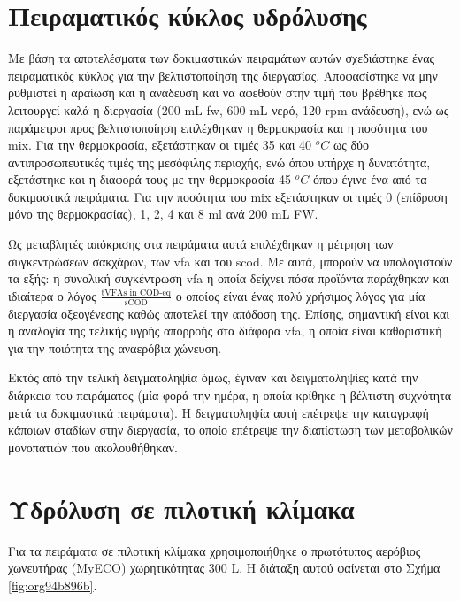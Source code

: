 \documentclass[11pt]{report}
\begin{document}
\section{Πειραματικός κύκλος υδρόλυσης}
\label{sec:orgeabfe86}
\label{sec:lab-hydro}
Με βάση τα αποτελέσματα των δοκιμαστικών πειραμάτων αυτών σχεδιάστηκε ένας πειραματικός κύκλος για την βελτιστοποίηση της διεργασίας. Αποφασίστηκε να μην ρυθμιστεί η αραίωση και η ανάδευση και να αφεθούν στην τιμή που βρέθηκε πως λειτουργεί καλά η διεργασία (200 mL \acrshort{fw}, 600 mL νερό, 120 rpm ανάδευση), ενώ ως παράμετροι προς βελτιστοποίηση επιλέχθηκαν η θερμοκρασία και η ποσότητα του \acrshort{mix}. Για την θερμοκρασία, εξετάστηκαν οι τιμές 35 και 40 \(^oC\) ως δύο αντιπροσωπευτικές τιμές της μεσόφιλης περιοχής, ενώ όπου υπήρχε η δυνατότητα, εξετάστηκε και η διαφορά τους με την θερμοκρασία 45 \(^oC\) όπου έγινε ένα από τα δοκιμαστικά πειράματα. Για την ποσότητα του \acrshort{mix} εξετάστηκαν οι τιμές 0 (επίδραση μόνο της θερμοκρασίας), 1, 2, 4 και 8 ml ανά 200 mL FW. 

Ως μεταβλητές απόκρισης στα πειράματα αυτά επιλέχθηκαν η μέτρηση των συγκεντρώσεων σακχάρων, των \acrshort{vfa} και του \acrshort{scod}.  Με αυτά, μπορούν να υπολογιστούν τα εξής: η συνολική συγκέντρωση \acrshort{vfa} η οποία δείχνει πόσα προϊόντα παράχθηκαν και ιδιαίτερα ο λόγος \(\frac{\text{tVFAs in COD-eq}}{\text{sCOD}}\) ο οποίος είναι ένας πολύ χρήσιμος λόγος για μία διεργασία οξεογένεσης καθώς αποτελεί την απόδοση της. Επίσης, σημαντική είναι και η αναλογία της τελικής υγρής απορροής στα διάφορα \acrshort{vfa}, η οποία είναι καθοριστική για την ποιότητα της αναερόβια χώνευση.

Εκτός από την τελική δειγματοληψία όμως, έγιναν και δειγματοληψίες κατά την διάρκεια του πειράματος (μία φορά την ημέρα, η οποία κρίθηκε η βέλτιστη συχνότητα μετά τα δοκιμαστικά πειράματα). Η δειγματοληψία αυτή επέτρεψε την καταγραφή κάποιων σταδίων στην διεργασία, το οποίο επέτρεψε την διαπίστωση των μεταβολικών μονοπατιών που ακολουθήθηκαν.

\section{Υδρόλυση σε πιλοτική κλίμακα}
\label{sec:org003daa9}
\label{sec:pilot-exp}

Για τα πειράματα σε πιλοτική κλίμακα χρησιμοποιήθηκε ο πρωτότυπος αερόβιος χωνευτήρας (MyECO) χωρητικότητας 300 L. Η διάταξη αυτού φαίνεται στο Σχήμα \ref{fig:org94b896b}.
\end{document}
